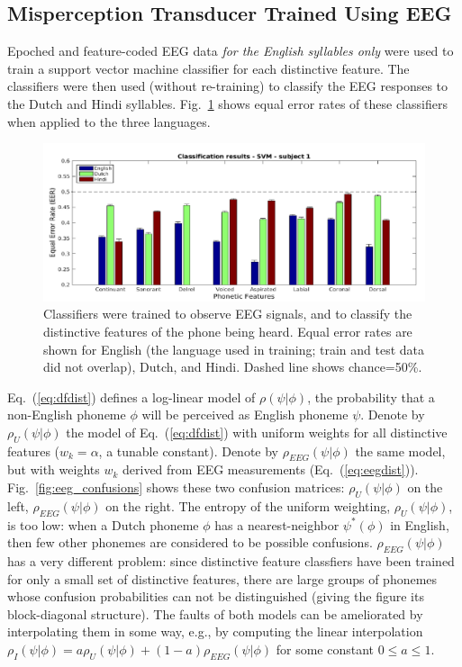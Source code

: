 \subsection{Misperception Transducer Trained Using EEG}
\label{ssec:eeg}

\newcommand{\specialcell}[2][c]{%
  \begin{tabular}[#1]{@{}c@{}}#2\end{tabular}}

Epoched and feature-coded EEG data {\em for the English syllables only}
were used to train a support vector machine classifier for each distinctive feature.
The classifiers were then used (without re-training) to classify the
EEG responses to the Dutch and Hindi syllables.
Fig.~\ref{fig:eeg_svm_eers} shows equal error rates of these
classifiers when applied to the three languages.

\begin{figure}
  \centerline{\includegraphics[width=5in]{../figs/diliberto_svmresults.png}}
  \caption{Classifiers were trained to observe EEG signals, and to
    classify the distinctive features of the phone being heard.  Equal
    error rates are shown for English (the language used in training;
    train and test data did not overlap), Dutch, and Hindi.  Dashed
    line shows chance=50\%.}
  \label{fig:eeg_svm_eers}
\end{figure}

Eq.~(\ref{eq:dfdist}) defines a log-linear model of $\rho(\psi|\phi)$,
the probability that a non-English phoneme $\phi$ will be perceived as
English phoneme $\psi$.  Denote by $\rho_U(\psi|\phi)$ the model of
Eq.~(\ref{eq:dfdist}) with uniform weights for all distinctive
features ($w_k=\alpha$, a tunable constant).  Denote by
$\rho_{EEG}(\psi|\phi)$ the same model, but with weights $w_k$ derived
from EEG measurements (Eq.~(\ref{eq:eegdist})).
Fig.~\ref{fig:eeg_confusions} shows these two confusion matrices:
$\rho_U(\psi|\phi)$ on the left, $\rho_{EEG}(\psi|\phi)$ on the
right. The entropy of the uniform weighting, $\rho_U(\psi|\phi)$, is
too low: when a Dutch phoneme $\phi$ has a nearest-neighbor
$\psi^*(\phi)$ in English, then few other phonemes are considered to
be possible confusions.  $\rho_{EEG}(\psi|\phi)$ has a very different
problem: since distinctive feature classfiers have been trained for
only a small set of distinctive features, there are large groups of
phonemes whose confusion probabilities can not be distinguished
(giving the figure its block-diagonal structure).  The faults of both
models can be ameliorated by interpolating them in some way, e.g., by
computing the linear interpolation
$\rho_I(\psi|\phi)=a\rho_U(\psi|\phi)+(1-a)\rho_{EEG}(\psi|\phi)$ for
some constant $0\le a\le 1$.

